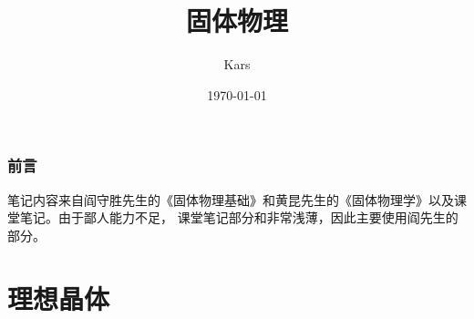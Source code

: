 \documentclass[12pt]{book}
\title{固体物理}
\author{Kars}
\date{\today}
\numberwithin{equation}{section}
\begin{document}
\maketitle



\tableofcontents
\clearpage
\section[Preface]{前言}
	笔记内容来自阎守胜先生的《固体物理基础》和黄昆先生的《固体物理学》以及课堂笔记。由于鄙人能力不足，
	课堂笔记部分和非常浅薄，因此主要使用阎先生的部分。
\part{理想晶体}






\end{document}
